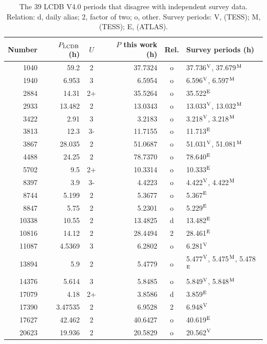 \begin{table}
\centering
\caption{The 39 LCDB V4.0 periods that disagree with independent survey data. Relation: d, daily alias; 2,
factor of two; o, other. Survey periods: V, \citet{Vavilov2025} (TESS); M, \citet{McNeill2023} (TESS); E,
\citet{Erasmus2020} (ATLAS).}\label{tab:lcdb39}
\footnotesize
\begin{tabular}{rrcrcl}
\hline
Number & $P_{\rm LCDB}$ (h) & $U$ & $P$ this work (h) & Rel. & Survey periods (h) \\
\hline
1040 & 59.2 & 2 & 37.7324 & o & 37.736$^{\rm V}$, 37.679$^{\rm M}$ \\
1940 & 6.953 & 3 & 6.5954 & o & 6.596$^{\rm V}$, 6.597$^{\rm M}$ \\
2884 & 14.31 & 2+ & 35.5264 & o & 35.522$^{\rm E}$ \\
2933 & 13.482 & 2 & 13.0343 & o & 13.033$^{\rm V}$, 13.032$^{\rm M}$ \\
3422 & 2.91 & 3 & 3.2183 & o & 3.218$^{\rm V}$, 3.218$^{\rm M}$ \\
3813 & 12.3 & 3- & 11.7155 & o & 11.713$^{\rm E}$ \\
3867 & 28.035 & 2 & 51.0687 & o & 51.031$^{\rm V}$, 51.081$^{\rm M}$ \\
4488 & 24.25 & 2 & 78.7370 & o & 78.640$^{\rm E}$ \\
5702 & 9.5 & 2+ & 10.3314 & o & 10.333$^{\rm E}$ \\
8397 & 3.9 & 3- & 4.4223 & o & 4.422$^{\rm V}$, 4.422$^{\rm M}$ \\
8744 & 5.199 & 2 & 5.3677 & o & 5.367$^{\rm E}$ \\
8847 & 5.75 & 2 & 5.2301 & o & 5.229$^{\rm E}$ \\
10338 & 10.55 & 2 & 13.4825 & d & 13.482$^{\rm E}$ \\
10816 & 14.12 & 2 & 28.4494 & 2 & 28.461$^{\rm E}$ \\
11087 & 4.5369 & 3 & 6.2802 & o & 6.281$^{\rm V}$ \\
13894 & 5.9 & 2 & 5.4779 & o & 5.477$^{\rm V}$, 5.475$^{\rm M}$, 5.478$^{\rm E}$ \\
14376 & 5.614 & 3 & 5.8485 & o & 5.849$^{\rm V}$, 5.848$^{\rm M}$ \\
17079 & 4.18 & 2+ & 3.8586 & d & 3.859$^{\rm E}$ \\
17390 & 3.47535 & 2 & 6.9528 & 2 & 6.948$^{\rm V}$ \\
17627 & 42.462 & 2 & 40.6427 & o & 40.619$^{\rm E}$ \\
20623 & 19.936 & 2 & 20.5829 & o & 20.562$^{\rm V}$ \\

\end{tabular}
\end{table}
